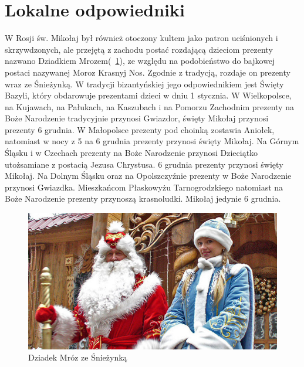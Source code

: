 \documentclass[oneside, fleqn]{book}
\begin{document}
\section{Lokalne odpowiedniki}
W Rosji św. Mikołaj był również otoczony kultem jako patron uciśnionych i skrzywdzonych, ale przejętą z zachodu postać rozdającą dzieciom prezenty nazwano Dziadkiem Mrozem(~\ref{rys:mik:2}), ze względu na podobieństwo do bajkowej postaci nazywanej Moroz Krasnyj Nos. Zgodnie z tradycją, rozdaje on prezenty wraz ze Śnieżynką. W tradycji bizantyńskiej jego odpowiednikiem jest Święty Bazyli, który obdarowuje prezentami dzieci w dniu 1 stycznia. W Wielkopolsce, na Kujawach, na Pałukach, na Kaszubach i na Pomorzu Zachodnim prezenty na Boże Narodzenie tradycyjnie przynosi Gwiazdor, święty Mikołaj przynosi prezenty 6 grudnia. W Małopolsce prezenty pod choinką zostawia Aniołek, natomiast w nocy z 5 na 6 grudnia prezenty przynosi święty Mikołaj. Na Górnym Śląsku i w Czechach prezenty na Boże Narodzenie przynosi Dzieciątko utożsamiane z postacią Jezusa Chrystusa. 6 grudnia prezenty przynosi święty Mikołaj. Na Dolnym Śląsku oraz na Opolszczyźnie prezenty w Boże Narodzenie przynosi Gwiazdka. Mieszkańcom Płaskowyżu Tarnogrodzkiego natomiast na Boże Narodzenie prezenty przynoszą krasnoludki. Mikołaj jedynie 6 grudnia.
\begin{figure}[htbp]

\includegraphics[width=\textwidth]{2.jpg}
\caption{Dziadek Mróz ze Śnieżynką}\label{rys:mik:2}

\end{figure}
\end{document}

